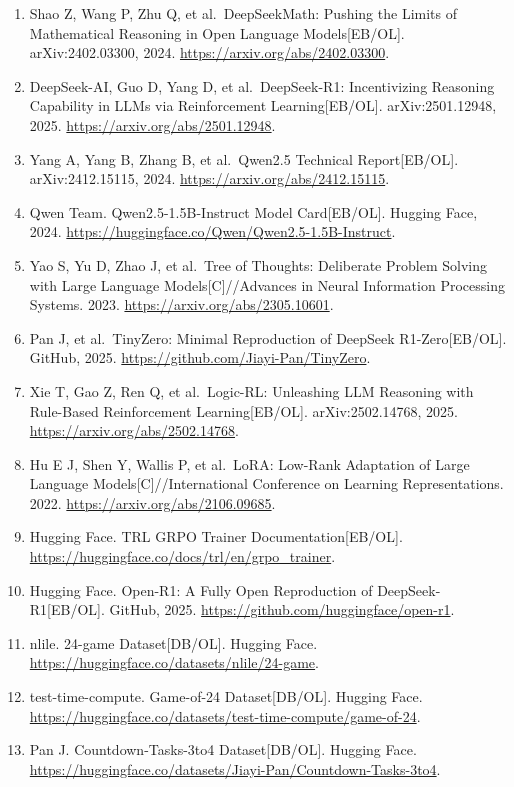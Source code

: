 \documentclass[UTF8,a4paper,12pt]{ctexart}
\providecommand{\tightlist}{\setlength{\itemsep}{0pt}\setlength{\parskip}{0pt}}
\begin{document}
\begin{enumerate}
\def\labelenumi{\arabic{enumi}.}
\tightlist
\item
  Shao Z, Wang P, Zhu Q, et al.~DeepSeekMath: Pushing the Limits of Mathematical Reasoning in Open Language Models{[}EB/OL{]}. arXiv:2402.03300, 2024. \url{https://arxiv.org/abs/2402.03300}.
\item
  DeepSeek-AI, Guo D, Yang D, et al.~DeepSeek-R1: Incentivizing Reasoning Capability in LLMs via Reinforcement Learning{[}EB/OL{]}. arXiv:2501.12948, 2025. \url{https://arxiv.org/abs/2501.12948}.
\item
  Yang A, Yang B, Zhang B, et al.~Qwen2.5 Technical Report{[}EB/OL{]}. arXiv:2412.15115, 2024. \url{https://arxiv.org/abs/2412.15115}.
\item
  Qwen Team. Qwen2.5-1.5B-Instruct Model Card{[}EB/OL{]}. Hugging Face, 2024. \url{https://huggingface.co/Qwen/Qwen2.5-1.5B-Instruct}.
\item
  Yao S, Yu D, Zhao J, et al.~Tree of Thoughts: Deliberate Problem Solving with Large Language Models{[}C{]}//Advances in Neural Information Processing Systems. 2023. \url{https://arxiv.org/abs/2305.10601}.
\item
  Pan J, et al.~TinyZero: Minimal Reproduction of DeepSeek R1-Zero{[}EB/OL{]}. GitHub, 2025. \url{https://github.com/Jiayi-Pan/TinyZero}.
\item
  Xie T, Gao Z, Ren Q, et al.~Logic-RL: Unleashing LLM Reasoning with Rule-Based Reinforcement Learning{[}EB/OL{]}. arXiv:2502.14768, 2025. \url{https://arxiv.org/abs/2502.14768}.
\item
  Hu E J, Shen Y, Wallis P, et al.~LoRA: Low-Rank Adaptation of Large Language Models{[}C{]}//International Conference on Learning Representations. 2022. \url{https://arxiv.org/abs/2106.09685}.
\item
  Hugging Face. TRL GRPO Trainer Documentation{[}EB/OL{]}. \url{https://huggingface.co/docs/trl/en/grpo_trainer}.
\item
  Hugging Face. Open-R1: A Fully Open Reproduction of DeepSeek-R1{[}EB/OL{]}. GitHub, 2025. \url{https://github.com/huggingface/open-r1}.
\item
  nlile. 24-game Dataset{[}DB/OL{]}. Hugging Face. \url{https://huggingface.co/datasets/nlile/24-game}.
\item
  test-time-compute. Game-of-24 Dataset{[}DB/OL{]}. Hugging Face. \url{https://huggingface.co/datasets/test-time-compute/game-of-24}.
\item
  Pan J. Countdown-Tasks-3to4 Dataset{[}DB/OL{]}. Hugging Face. \url{https://huggingface.co/datasets/Jiayi-Pan/Countdown-Tasks-3to4}.
\end{enumerate}
\end{document}
